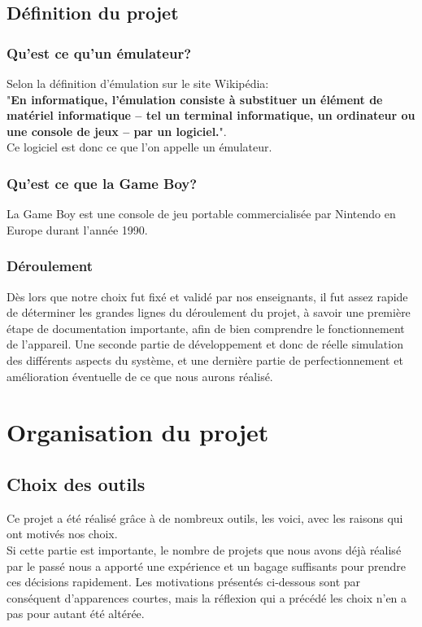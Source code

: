 \documentclass{report}
\begin{document}
\section*{Définition du projet}
\subsection*{Qu'est ce qu'un émulateur?}
	Selon la définition d'émulation sur le site Wikipédia:\\"\textbf{En informatique, l'émulation consiste à substituer un élément de matériel informatique – tel un terminal informatique, un ordinateur ou une console de jeux – par un logiciel.}".\\Ce logiciel est donc ce que l'on appelle un émulateur.
\subsection*{Qu'est ce que la Game Boy?}
	La Game Boy est une console de jeu portable commercialisée par Nintendo en Europe durant l'année 1990.
\subsection*{Déroulement}
	Dès lors que notre choix fut fixé et validé par nos enseignants, il
	fut assez rapide de déterminer les grandes lignes du déroulement du
	projet, à savoir une première étape de documentation importante, afin
	de bien comprendre le fonctionnement de l'appareil. Une seconde partie
	de développement et donc de réelle simulation des différents aspects
	du système, et une dernière partie de perfectionnement et
	amélioration éventuelle de ce que nous aurons réalisé.

\chapter{Organisation du projet}
\section{Choix des outils}
Ce projet a été réalisé grâce à de nombreux outils, les voici, avec les raisons qui ont motivés nos choix.\\
Si cette partie est importante, le nombre de projets que nous avons déjà réalisé par le passé nous a apporté une expérience et un bagage suffisants pour prendre ces décisions rapidement. Les motivations présentés ci-dessous sont par conséquent d'apparences courtes, mais la réflexion qui a précédé les choix n'en a pas pour autant été altérée.
\end{document}
